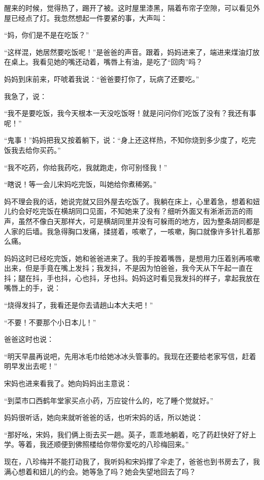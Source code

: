 \par 醒来的时候，觉得热了，踢开了被。这时屋里漆黑，隔着布帘子空隙，可以看见外屋已经点了灯。我忽然想起一件要紧的事，大声叫：
\par “妈，你们是不是在吃饭？”
\par “这样混，她居然要吃饭呢！”是爸爸的声音。跟着，妈妈进来了，端进来煤油灯放在桌上。我看见她的嘴还动着，嘴唇上有油，是吃了“回肉”吗？
\par 妈妈到床前来，吓唬着我说：“爸爸要打你了，玩病了还要吃。”
\par 我急了，说：
\par “我不是要吃饭，我今天根本一天没吃饭呀！就是问问你们吃饭了没有？我还有事呢！”
\par “鬼事！”妈妈把我又按着躺下，说：“身上还这样热，不知你烧到多少度了，吃完饭我去给你买药。”
\par “我不吃药，你给我药吃，我就跑走，你可别怪我！”
\par “瞎说！等一会儿宋妈吃完饭，叫她给你煮稀粥。”
\par 妈不理会我的话，她说完就又回外屋去吃饭了。我躺在床上，心里着急，想着和妞儿约会好吃完饭在横胡同口见面，不知她来了没有？细听外面又有淅淅沥沥的雨声，虽然不像白天那样大，可是横胡同里并没有可躲雨的地方，因为整条胡同都是人家的后墙。我急得胸口发痛，揉搓着，咳嗽了，一咳嗽，胸口就像许多针扎着那么痛。
\par 妈妈这时已经吃完饭，她和爸爸进来了。我的手按着嘴唇，是想用力压着别再咳嗽出来，但是手竟在嘴上发抖；我发抖，不是因为怕爸爸，我今天从下午起一直在抖；腿在抖，手也抖，心也抖，牙也抖。妈妈这时看见我发抖的样子，拿起我放在嘴唇上的手，说：
\par “烧得发抖了，我看还是你去请趟山本大夫吧！”
\par “不要！不要那个小日本儿！”
\par 爸爸这时也说：
\par “明天早晨再说吧，先用冰毛巾给她冰冰头管事的。我现在还要给老家写信，赶着明早发出去呢！”
\par 宋妈也进来看我了。她向妈妈出主意说：
\par “到菜市口西鹤年堂家买点小药，万应锭什么的，吃了睡个觉就好。”
\par 妈妈很听话，她向来就听爸爸的话，也听宋妈的话，所以她说：
\par “那好吆，宋妈，我们俩上街去买一趟。英子，乖乖地躺着，吃了药赶快好了好上学。等着，我还顺便到佛照楼给你带你爱吃的八珍梅回来。”
\par 现在，八珍梅并不能打动我了，我听妈和宋妈撑了伞走了，爸爸也到书房去了，我满心想着和妞儿的约会。她等急了吗？她会失望地回去了吗？
